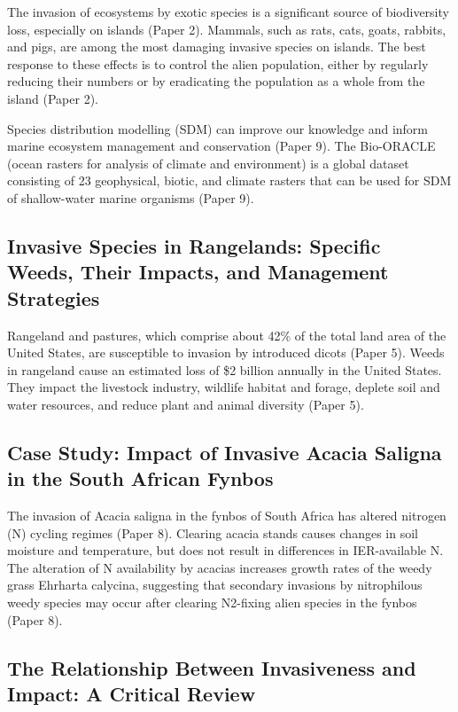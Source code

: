 \documentclass{article}
\begin{document}
The invasion of ecosystems by exotic species is a significant source of biodiversity loss, especially on islands (Paper 2). Mammals, such as rats, cats, goats, rabbits, and pigs, are among the most damaging invasive species on islands. The best response to these effects is to control the alien population, either by regularly reducing their numbers or by eradicating the population as a whole from the island (Paper 2).

Species distribution modelling (SDM) can improve our knowledge and inform marine ecosystem management and conservation (Paper 9). The Bio-ORACLE (ocean rasters for analysis of climate and environment) is a global dataset consisting of 23 geophysical, biotic, and climate rasters that can be used for SDM of shallow-water marine organisms (Paper 9).

\subsection{Invasive Species in Rangelands: Specific Weeds, Their Impacts, and Management Strategies}

Rangeland and pastures, which comprise about 42\% of the total land area of the United States, are susceptible to invasion by introduced dicots (Paper 5). Weeds in rangeland cause an estimated loss of \$2 billion annually in the United States. They impact the livestock industry, wildlife habitat and forage, deplete soil and water resources, and reduce plant and animal diversity (Paper 5).

\subsection{Case Study: Impact of Invasive Acacia Saligna in the South African Fynbos}

The invasion of Acacia saligna in the fynbos of South Africa has altered nitrogen (N) cycling regimes (Paper 8). Clearing acacia stands causes changes in soil moisture and temperature, but does not result in differences in IER-available N. The alteration of N availability by acacias increases growth rates of the weedy grass Ehrharta calycina, suggesting that secondary invasions by nitrophilous weedy species may occur after clearing N2-fixing alien species in the fynbos (Paper 8).

\subsection{The Relationship Between Invasiveness and Impact: A Critical Review}
\end{document}
